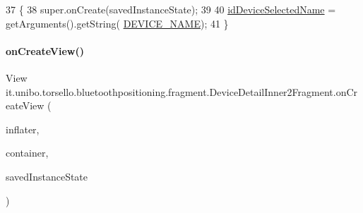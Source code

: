 \begin{DoxyCode}
37                                                     \{
38         super.onCreate(savedInstanceState);
39 
40         \hyperlink{classit_1_1unibo_1_1torsello_1_1bluetoothpositioning_1_1fragment_1_1DeviceDetailInner2Fragment_a84cd6ba00a3c2e8b7a53cac62c73f1b5_a84cd6ba00a3c2e8b7a53cac62c73f1b5}{idDeviceSelectedName} = getArguments().getString(
      \hyperlink{classit_1_1unibo_1_1torsello_1_1bluetoothpositioning_1_1fragment_1_1DeviceDetailInner2Fragment_aa28d537983d4cf578120a9c51eb2b0bb_aa28d537983d4cf578120a9c51eb2b0bb}{DEVICE\_NAME});
41     \}
\end{DoxyCode}
\hypertarget{classit_1_1unibo_1_1torsello_1_1bluetoothpositioning_1_1fragment_1_1DeviceDetailInner2Fragment_aaaab1478726f0d8a4b9bdfe3eab122c8_aaaab1478726f0d8a4b9bdfe3eab122c8}{}\label{classit_1_1unibo_1_1torsello_1_1bluetoothpositioning_1_1fragment_1_1DeviceDetailInner2Fragment_aaaab1478726f0d8a4b9bdfe3eab122c8_aaaab1478726f0d8a4b9bdfe3eab122c8} 
\paragraph{\texorpdfstring{on\+Create\+View()}{onCreateView()}}
{\footnotesize\ttfamily View it.\+unibo.\+torsello.\+bluetoothpositioning.\+fragment.\+Device\+Detail\+Inner2\+Fragment.\+on\+Create\+View (\begin{DoxyParamCaption}\item[{Layout\+Inflater}]{inflater,  }\item[{View\+Group}]{container,  }\item[{Bundle}]{saved\+Instance\+State }\end{DoxyParamCaption})}


